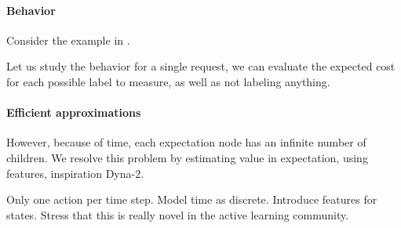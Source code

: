 \paragraph{Behavior}
Consider the example in .


Let us study the behavior for a single request, we can evaluate the expected cost for each possible label to measure, as well as not labeling anything.

\paragraph{Efficient approximations}

However, because of time, each expectation node has an infinite number of children.
We resolve this problem by estimating value in expectation, using features, inspiration Dyna-2. 

Only one action per time step.
Model time as discrete. Introduce features for states.
Stress that this is really novel in the active learning community.


